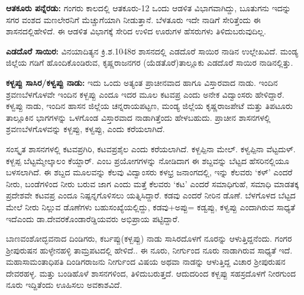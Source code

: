 \newpage

\textbf{ಆತಕೂರು ಪನ್ನೆರಡು:} ಗಂಗರು ಕಾಲದಲ್ಲಿ ಆತಕೂರು-12 ಒಂದು ಆಡಳಿತ ವಿಭಾಗವಾಗಿದ್ದು, ಬೂತುಗನು ಇದನ್ನು ಸಗರ ವಂಶದ ಮಣಲೇರನಿಗೆ ಮೆಚ್ಚುಗೆಯಾಗಿ ನೀಡುತ್ತಾನೆ. ಬೆಳತೂರು ಇದೇ ನಾಡಿಗೆ ಸೇರಿತ್ತೆಂದು ಈ ಶಾಸನದಲ್ಲಿ\break ಹೇಳಿದೆ. ಈ ಆಡಳಿತ ವಿಭಾಗಕ್ಕೆ ಸೇರಿದ ಉಳಿದ ಊರುಗಳ ಹೆಸರುಗಳು ತಿಳಿದುಬರುವುದಿಲ್ಲ.

\textbf{ಎಡದೊರೆ ಸಾಯಿರ:} ವಿನಯಾದಿತ್ಯನ ಕ್ರಿ.ಶ.1048ರ ಶಾಸನದಲ್ಲಿ ಎಡದೊರೆ ಸಾಯಿರ ನಾಡಿನ ಉಲ್ಲೇಖವಿದೆ. ಮಂಡ್ಯ ಜಿಲ್ಲೆಯ ಗಡಿಗೆ ಹೊಂದಿಕೊಂಡಿರುವ, ಕೃಷ್ಣರಾಜನಗರ (ಯೆಡತೊರೆ)ತಾಲ್ಲೂಕು ಎಡದೊರೆ ಸಾಯಿರ ನಾಡಿನಲ್ಲಿತ್ತು.

\textbf{ಕಳ್ಬಪ್ಪು ಸಾಸಿರ/ಕಳ್ವಪ್ಪು ನಾಡು:} ಇದು ಒಂದು ಅತ್ಯಂತ ಪ್ರಾಚೀನವಾದ ಹಾಗೂ ವಿಸ್ತಾರವಾದ ನಾಡು. ಇಂದಿನ ಶ್ರವಣಬೆಳಗೊಳವೇ ಇಂದಿನ ಕಳ್ಬಪ್ಪು ಎಂದೂ ಇದರ ಮೂಲ ಕಟವಪ್ರ ಎಂದು ಅನೇಕ ವಿದ್ವಾಂಸರು ಹೇಳಿದ್ದಾರೆ. ಕಳ್ವಪ್ಪು ನಾಡು, ಇಂದಿನ ಹಾಸನ ಜಿಲ್ಲೆಯ ಚನ್ನರಾಯಪಟ್ಟಣ, ಮಂಡ್ಯ ಜಿಲ್ಲೆಯ ಕೃಷ್ಣರಾಜಪೇಟೆ ಮತ್ತು ತಿಪಟೂರು ತಾಲ್ಲೂಕಿನ ಭಾಗಗಳನ್ನು ಒಳಗೊಂಡ ವಿಸ್ತಾರವಾದ ನಾಡಾಗಿತ್ತೆಂದು ಹೇಳಬಹುದು. ಪ್ರಾಚೀನ ಶಾಸನಗಳಲ್ಲಿ ಶ್ರವಣಬೆಳಗೊಳವನ್ನು ಕಳ್ಬಪ್ಪು, ಕಳ್ವಪ್ಪು, ಎಂದು ಕರೆಯಲಾಗಿದೆ.

ಸಂಸ್ಕೃತ ಶಾಸನಗಳಲ್ಲಿ ಕಟವಪ್ರಗಿರಿ, ಕಟವಪ್ರಶೈಲ ಎಂದು ಕರೆಯಲಾಗಿದೆ. ಕಳ್ಬಪ್ಪಿನಾ ಮೇಲ್. ಕಳ್ವಪ್ಪಿನಾ ವೆಟ್ಟದುಳ್. ಕಳ್ಬಪ್ಪ ಬೆಟ್ಟಮ್ಮೇಲ್ಕಾಲಂ ಕೆಯ್ದಾರ್. ಎಂಬ ಪ್ರಯೋಗಗಳನ್ನು ನೋಡಿದಾಗ ಈ ಶಬ್ದವನ್ನು ಬೆಟ್ಟದ ಹೆಸರಿನಲ್ಲಿಯೂ ಬಳಸಲಾಗಿದೆ. ಈ ಶಬ್ದದ ಮೂಲವನ್ನು ಕೆಲವು ವಿದ್ವಾಂಸರು ಕಳಭ್ರ ಜನಾಂಗದಲ್ಲಿ, ಇನ್ನು ಕೆಲವರು ‘ಕಳ್​’ ಎಂದರೆ ನೀರು, ಬಂಡೆಗಳಿಂದ ನೀರು ಬರುವ ಜಾಗ ಎಂದು ಮತ್ತೆ ಕೆಲವರು ‘ಕಟ’ ಎಂದರೆ ಸಮಾಧಿಗುಹೆ, ಸಮಾಧಿ ಮಾಡತಕ್ಕ ಪ್ರದೇಶವೇ ಕಟವಪ್ರ ಎಂದೂ ನಿಷ್ಪನ್ನಗೊಳಿಸಲು ಯತ್ನಿಸಿದ್ದಾರೆ. ಕಡವು ಎಂದರೆ ನೀರಿನ ಡೊಣೆ. ಬೆಳಗೊಳದ ಬೆಟ್ಟದ ಮೇಲೆ ನೀರು ನಿಲ್ಲುವ ಡೊಣೆಗಳು ಬಹುಸಂಖ್ಯೆಯಲ್ಲಿದ್ದು, ಕಡವು+ಅಪ್ಪು= ಕಡ್ವಪ್ಪು, ಕಳ್ವಪ್ಪು ಎಂದಾಗಿರುವ ಸಾಧ್ಯತೆ ಇದೆ\break ಎಂದು ಡಾ.ದೇವರಕೊಂಡಾರೆಡ್ಡಿಯವರು ಅಭಿಪ್ರಾಯ ಪಟ್ಟಿದ್ದಾರೆ.

ಬಾಣವಂಶೋದ್ಭವನಾದ ದಿಂಡಿಗರು, ಕರ್ಬಪ್ಪು(ಕಳ್ಬಪ್ಪು) ನಾಡು ಸಾಸಿರದೊಳಗೆ ನೂರನ್ನು ಆಳುತ್ತಿದ್ದನೆಂದು. ಗಂಗರ ಶ‍್ರೀಪುರುಷನ ಹುಳ್ಳೇನಹಳ್ಳಿ ತಾಮ್ರಪಟದಲ್ಲಿ ಹೇಳಿದೆ.. ಈ ನೂರು, ನೀರ್ಗುಂದ ನೂರು ನಾಡಾಗಿರುವ ಸಾಧ್ಯತೆ ಇದೆ. ಮಹಾಸಾಮಂತಾಧಿಪತಿ ದಿಂಡಿಗರಾಜನು ನೀರ್ಗುಂದ ವಿಷಯ ಅಥವಾ ನಾಡನ್ನು ಆಳುತ್ತಿದ್ದ ವಿಚಾರ ಶ‍್ರೀಪುರುಷನ ದೇವರಹಳ್ಳ. ಮತ್ತು ಬಂಡಿಹೊಳೆ ಶಾಸನಗಳಿಂದ, ತಿಳಿದುಬರುತ್ತದೆ. ಆದುದರಿಂದ ಕಳ್ಬಪ್ಪು ಸಹಸ್ರದೊಳಗೆ ನೀರಗುಂದ ನೂರು ಇದ್ದಿತೆಂದು ಊಹಿಸಲು ಅವಕಾಶವಿದೆ.


